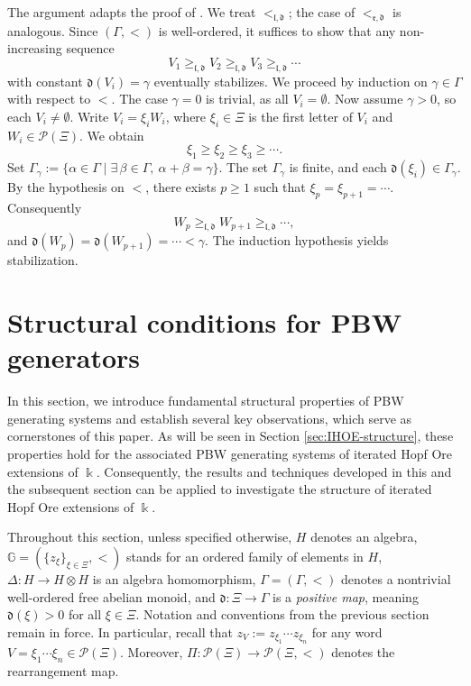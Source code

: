 \documentclass{article}
\makeatletter
\renewenvironment{proof}[1][\proofname]{\par
	\pushQED{\qed}%
	\normalfont \topsep6\p@\@plus6\p@\relax
	\trivlist
	\item[\hskip\labelsep
	\bfseries
	#1\@addpunct{.}]\ignorespaces
}{%
	\popQED\endtrivlist\@endpefalse
}
\theoremstyle{plain}
\theoremstyle{definition}
\numberwithin{equation}{section}
\newcommand{\PP}{\mathcal{P}}
\newcommand{\GG}{\mathbb{G}}
\newcommand{\dd}{\mathfrak{d}}
\newcommand{\rr}{\mathfrak{r}}
\makeatother
\begin{document}
	\begin{proof}
		The argument adapts the proof of \cite[Lemma 3.1]{LZ25}. We treat $<_{\mathfrak{l}, \dd}$; the case of $<_{\rr , \dd}$ is analogous. Since $(\Gamma,<)$ is well-ordered, it suffices to show that any non-increasing sequence
		\[
		V_1 \geq_{\mathfrak{l}, \dd} V_2 \geq_{\mathfrak{l}, \dd} V_3 \geq_{\mathfrak{l}, \dd} \cdots
		\]
		with constant $\dd(V_i)=\gamma$ eventually stabilizes. We proceed by induction on $\gamma\in\Gamma$ with respect to $<$. The case $\gamma=0$ is trivial, as all $V_i=\emptyset$. Now assume $\gamma>0$, so each $V_{i}\neq \emptyset$. Write $V_{i}=\xi_{i}W_{i}$, where $\xi_{i}\in\Xi$ is the first letter of $V_i$ and $W_{i}\in\PP(\Xi)$. We obtain
		\[
		\xi_{1}\geq\xi_{2} \geq\xi_{3} \geq\cdots.
		\]
		Set $\Gamma_{\gamma}:=\{\alpha\in \Gamma \mid \exists\,\beta\in\Gamma,\ \alpha+\beta =\gamma\}$. The set $\Gamma_{\gamma}$ is finite, and each $\dd(\xi_{i})\in \Gamma_{\gamma}$. By the hypothesis on $<$, there exists $p\ge1$ such that $\xi_{p}=\xi_{p+1}=\cdots$. Consequently
		\[
		W_p\geq_{\mathfrak{l}, \dd} W_{p+1}\geq_{\mathfrak{l}, \dd} \cdots,
		\]
		and $\dd(W_{p})=\dd(W_{p+1})=\cdots < \gamma$. The induction hypothesis yields stabilization.
	\end{proof}
	
	\section{Structural conditions for PBW generators}
	\label{sec:triangular}
	
	In this section, we introduce fundamental structural properties of PBW generating systems and establish several key observations, which serve as cornerstones of this paper. As will be seen in Section \ref{sec:IHOE-structure}, these properties hold for the associated PBW generating systems of iterated Hopf Ore extensions of $\Bbbk$. Consequently, the results and techniques developed in this and the subsequent section can be applied to investigate the structure of iterated Hopf Ore extensions of $\Bbbk$.
	
	
	
	
	Throughout this section, unless specified otherwise, $H$ denotes an algebra, $\GG=(\{z_{\xi}\}_{\xi\in \Xi}, <)$ stands for an ordered family of elements in $H$, $\Delta\colon H\to H\otimes H$ is an algebra homomorphism, $\Gamma=(\Gamma,<)$ denotes a nontrivial well-ordered free abelian monoid, and $\dd\colon \Xi \to \Gamma$ is a \emph{positive map}, meaning $\dd(\xi)>0$ for all $\xi\in \Xi$. Notation and conventions from the previous section remain in force. In particular, recall that $z_{V}:=z_{\xi_{1}}\cdots z_{\xi_{n}}$ for any word $V=\xi_{1}\cdots \xi_{n}\in \PP(\Xi)$. Moreover, $\Pi\colon \PP(\Xi) \to \PP(\Xi,<)$ denotes the rearrangement map.
	
\end{document}
